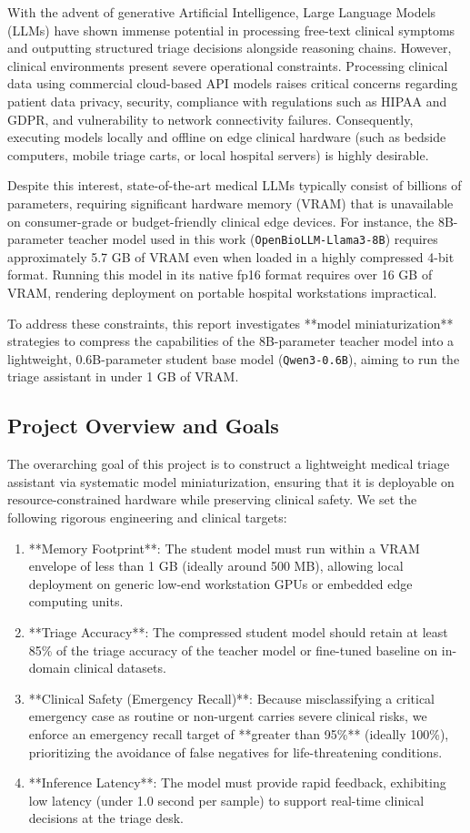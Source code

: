 \documentclass[a4paper, 12pt]{article}
\begin{document}
With the advent of generative Artificial Intelligence, Large Language Models (LLMs) have shown immense potential in processing free-text clinical symptoms and outputting structured triage decisions alongside reasoning chains. However, clinical environments present severe operational constraints. Processing clinical data using commercial cloud-based API models raises critical concerns regarding patient data privacy, security, compliance with regulations such as HIPAA and GDPR, and vulnerability to network connectivity failures. Consequently, executing models locally and offline on edge clinical hardware (such as bedside computers, mobile triage carts, or local hospital servers) is highly desirable.

Despite this interest, state-of-the-art medical LLMs typically consist of billions of parameters, requiring significant hardware memory (VRAM) that is unavailable on consumer-grade or budget-friendly clinical edge devices. For instance, the 8B-parameter teacher model used in this work (\texttt{OpenBioLLM-Llama3-8B}) requires approximately 5.7 GB of VRAM even when loaded in a highly compressed 4-bit format. Running this model in its native fp16 format requires over 16 GB of VRAM, rendering deployment on portable hospital workstations impractical.

To address these constraints, this report investigates **model miniaturization** strategies to compress the capabilities of the 8B-parameter teacher model into a lightweight, 0.6B-parameter student base model (\texttt{Qwen3-0.6B}), aiming to run the triage assistant in under 1 GB of VRAM.

\subsection{Project Overview and Goals}
The overarching goal of this project is to construct a lightweight medical triage assistant via systematic model miniaturization, ensuring that it is deployable on resource-constrained hardware while preserving clinical safety. We set the following rigorous engineering and clinical targets:
\begin{enumerate}
    \item **Memory Footprint**: The student model must run within a VRAM envelope of less than 1 GB (ideally around 500 MB), allowing local deployment on generic low-end workstation GPUs or embedded edge computing units.
    \item **Triage Accuracy**: The compressed student model should retain at least 85\% of the triage accuracy of the teacher model or fine-tuned baseline on in-domain clinical datasets.
    \item **Clinical Safety (Emergency Recall)**: Because misclassifying a critical emergency case as routine or non-urgent carries severe clinical risks, we enforce an emergency recall target of **greater than 95\%** (ideally 100\%), prioritizing the avoidance of false negatives for life-threatening conditions.
    \item **Inference Latency**: The model must provide rapid feedback, exhibiting low latency (under 1.0 second per sample) to support real-time clinical decisions at the triage desk.
\end{enumerate}
\end{document}
